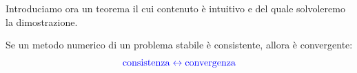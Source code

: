 Introduciamo ora un teorema il cui contenuto è intuitivo e del quale solvoleremo la dimostrazione.

\begin{theorem}
    Se un metodo numerico di un problema stabile è consistente, allora è convergente:
    \[
        \textcolor{blue}{\text{consistenza} \leftrightarrow \text{convergenza}}
    \]
\end{theorem}